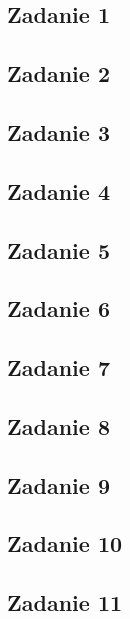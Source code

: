 \subsection{Zadanie 1}


\subsection{Zadanie 2}


\subsection{Zadanie 3}


\subsection{Zadanie 4} 


\subsection{Zadanie 5}


\subsection{Zadanie 6}


\subsection{Zadanie 7}


\subsection{Zadanie 8}


\subsection{Zadanie 9}


\subsection{Zadanie 10}
\label{page_fault_freq}


\subsection{Zadanie 11}
\label{printf_buffer_troll}
